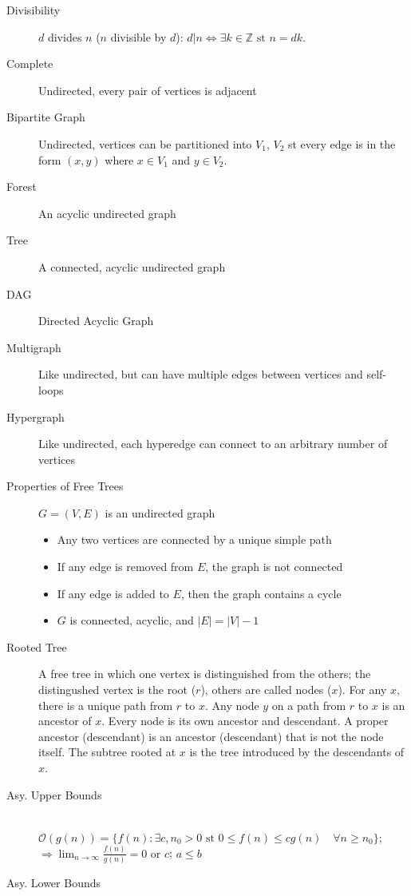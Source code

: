 \documentclass[8pt]{article}
\begin{document}
\begin{multicols}{2}
\begin{description}
  \item[Divisibility] $d$ divides $n$ ($n$ divisible by $d$): $d|n \Leftrightarrow
    \exists k \in \mathbb{Z}\text{ st } n = dk$.
  \item[Complete] Undirected, every pair of vertices is adjacent
  \item[Bipartite Graph] Undirected, vertices can be partitioned into
    $V_1$, $V_2$ st every edge is in the form $(x,y)$ where $x \in
    V_1$ and $y \in V_2$.
  \item[Forest] An acyclic undirected graph
  \item[Tree] A connected, acyclic undirected graph
  \item[DAG] Directed Acyclic Graph
  \item[Multigraph] Like undirected, but can have multiple edges
    between vertices and self-loops
  \item[Hypergraph] Like undirected, each hyperedge can connect to an
    arbitrary number of vertices
  \item[Properties of Free Trees] $G=(V,E)$ is an undirected graph
    \begin{itemize}
    \item Any two vertices are connected by a unique simple path
    \item If any edge is removed from $E$, the graph is not connected
    \item If any edge is added to $E$, then the graph contains a cycle
    \item $G$ is connected, acyclic, and $|E| = |V|-1$
    \end{itemize}
  \item[Rooted Tree] A free tree in which one vertex is distinguished
    from the others; the distingushed vertex is the root ($r$), others
    are called nodes ($x$). For any $x$, there is a unique path from
    $r$ to $x$. Any node $y$ on a path from $r$ to $x$ is an ancestor
    of $x$. Every node is its own ancestor and descendant. A proper
    ancestor (descendant) is an ancestor (descendant) that is not the
    node itself. The subtree rooted at $x$ is the tree introduced by
    the descendants of $x$.
  \item[Asy. Upper Bounds] \hfill \\
    $\mathcal{O}(g(n))=\{f(n): \exists c,n_0>0 \text{ st } 0 \le f(n)
    \le cg(n) \quad\forall n \ge n_0\}$; $\Rightarrow
    \lim_{n\rightarrow\infty}\frac{f(n)}{g(n)} = 0 \text{ or } c$;
    $a \le b$
  \item[Asy. Lower Bounds] \hfill\\

\end{description}
\end{multicols}
\end{document}
